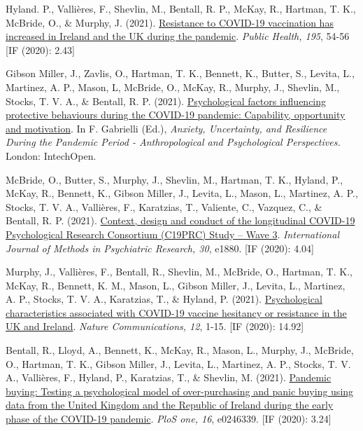 \documentclass[12pt]{article}
\begin{document}
\begin{bibenum}
\item Hyland. P., Vallières, F., Shevlin, M.,  
	Bentall, R. P., McKay, R., Hartman, T. K., 
	McBride, O., \& Murphy, J. (2021). 
	\href{https://doi.org/10.1016/j.puhe.2021.04.009}
	{Resistance to COVID-19 vaccination has increased 
	in Ireland and the UK during the pandemic}. 
	\emph{Public Health, 195}, 54-56 [IF (2020): 2.43]
	
\item Gibson Miller, J., Zavlis, O., Hartman, T. K., 
	Bennett, K., Butter, S., Levita, L., 
	Martinez, A. P., Mason, L, McBride, O., 
	McKay, R., Murphy, J., Shevlin, M., 
	Stocks, T. V. A., \& Bentall, R. P. (2021). 
	\href{https://doi.org/10.5772/intechopen.98237}
	{Psychological factors influencing protective 
	behaviours during the COVID-19 pandemic: 
	Capability, opportunity and motivation}. 
	In F. Gabrielli (Ed.), \textit{Anxiety, 
	Uncertainty, and Resilience During the 
	Pandemic Period - Anthropological and Psychological 
	Perspectives.} London: IntechOpen.
	
\item McBride, O., Butter, S., Murphy, J., 
	Shevlin, M., Hartman, T. K., Hyland, P., 
	McKay, R., Bennett, K., Gibson Miller, J.,  
	Levita, L., Mason, L., Martinez, A. P.,  
	Stocks, T. V. A., Vallières, F., Karatzias, T., 
	Valiente, C., Vazquez, C., \& Bentall, R. P. (2021). 
	\href{https://doi.org/10.1002/mpr.1880}
	{Context, design and conduct of the 
	longitudinal COVID-19 Psychological 
	Research Consortium (C19PRC) Study – Wave 3}.  
	\emph{International Journal of Methods in 
	Psychiatric Research, 30}, e1880. [IF (2020): 4.04]
		
\item Murphy, J., Vallières, F., Bentall, R., 
	Shevlin, M.,  McBride, O., Hartman, T. K., 
	McKay, R., Bennett, K. M., Mason, L.,  
	Gibson Miller, J., Levita, L., Martinez, A. P., 
	Stocks, T. V. A.,  Karatzias, T., \& Hyland, P. 
	(2021).
	\href{https://doi.org/10.1038/s41467-020-20226-9}
	{Psychological characteristics associated with 
	COVID-19 vaccine hesitancy or resistance in 
	the UK and Ireland}. 
	\emph{Nature Communications, 12}, 1-15. 
	[IF (2020): 14.92]

\item Bentall, R., Lloyd, A., Bennett, K., 
	McKay, R., Mason, L., Murphy, J., 
	McBride, O., Hartman, T. K., Gibson Miller, J., 
	Levita, L., Martinez, A. P., Stocks, T. V. A., 
	Vallières, F., Hyland, P., Karatzias, T., 
	\& Shevlin, M. (2021). 
	\href{https://doi.org/10.1371/journal.pone.0246339}
	{Pandemic buying: Testing a psychological 
	model of over-purchasing and panic buying 
	using data from the United Kingdom and 
	the Republic of Ireland during the early 
	phase of the COVID-19 pandemic}.
	\emph{PloS one, 16}, e0246339. [IF (2020): 3.24]
	

\end{bibenum}
\end{document}

